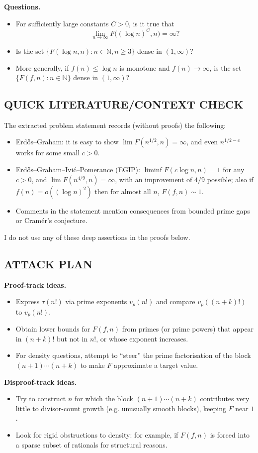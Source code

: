\textbf{Questions.}
\begin{itemize}
\item[(Q1)] For sufficiently large constants $C>0$, is it true that
\[
\lim_{n\to\infty} F\big((\log n)^C,n\big)=\infty?
\]
\item[(Q2)] Is the set $\{F(\log n,n): n\in\mathbb{N}, n\ge 3\}$ dense in $(1,\infty)$?
\item[(Q3)] More generally, if $f(n)\le \log n$ is monotone and $f(n)\to\infty$, is the set $\{F(f,n):n\in\mathbb{N}\}$ dense in $(1,\infty)$?
\end{itemize}

\subsection*{QUICK LITERATURE/CONTEXT CHECK}
The extracted problem statement records (without proofs) the following:
\begin{itemize}
\item Erd\H{o}s--Graham: it is easy to show $\lim F(n^{1/2},n)=\infty$, and even $n^{1/2-c}$ works for some small $c>0$.
\item Erd\H{o}s--Graham--Ivi\'{c}--Pomerance (EGIP): $\liminf F(c\log n,n)=1$ for any $c>0$, and $\lim F(n^{4/9},n)=\infty$, with an improvement of $4/9$ possible; also if $f(n)=o((\log n)^2)$ then for almost all $n$, $F(f,n)\sim 1$.
\item Comments in the statement mention consequences from bounded prime gaps or Cram\'{e}r's conjecture.
\end{itemize}
I do not use any of these deep assertions in the proofs below.

\subsection*{ATTACK PLAN}
\textbf{Proof-track ideas.}
\begin{itemize}
\item Express $\tau(n!)$ via prime exponents $v_p(n!)$ and compare $v_p((n+k)!)$ to $v_p(n!)$.
\item Obtain lower bounds for $F(f,n)$ from primes (or prime powers) that appear in $(n+k)!$ but not in $n!$, or whose exponent increases.
\item For density questions, attempt to ``steer'' the prime factorisation of the block $(n+1)\cdots(n+k)$ to make $F$ approximate a target value.
\end{itemize}
\textbf{Disproof-track ideas.}
\begin{itemize}
\item Try to construct $n$ for which the block $(n+1)\cdots(n+k)$ contributes very little to divisor-count growth (e.g. unusually smooth blocks), keeping $F$ near $1$.
\item Look for rigid obstructions to density: for example, if $F(f,n)$ is forced into a sparse subset of rationals for structural reasons.
\end{itemize}

